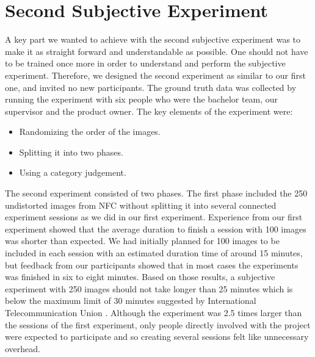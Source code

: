 \section{Second Subjective Experiment}
\label{sec:secondse}
A key part we wanted to achieve with the second subjective experiment was to make it as straight forward and understandable as possible. One should not have to be trained once more in order to understand and perform the subjective experiment. Therefore, we designed the second experiment as similar to our first one, and invited no new participants. The ground truth data was collected by running the experiment with six people who were the bachelor team, our supervisor and the product owner. The key elements of the experiment were: 
\begin{itemize}
    \item Randomizing the order of the images.
    \item Splitting it into two phases. 
    \item Using a category judgement.
\end{itemize}

The second experiment consisted of two phases. The first phase included the 250 undistorted images from NFC without splitting it into several connected experiment sessions as we did in our first experiment. Experience from our first experiment showed that the average duration to finish a session with 100 images was shorter than expected. We had initially planned for 100 images to be included in each session with an estimated duration time of around 15 minutes, but feedback from our participants showed that in most cases the experiments was finished in six to eight minutes. Based on those results, a subjective experiment with 250 images should not take longer than 25 minutes which is below the maximum limit of 30 minutes suggested by International Telecommunication Union \cite{methodologySubjective}. Although the experiment was 2.5 times larger than the sessions of the first experiment, only people directly involved with the project were expected to participate and so creating several sessions felt like unnecessary overhead. 

